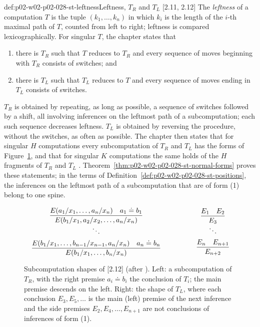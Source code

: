 \begin{hbdefinition}{def:p02-w02-p02-028-st-leftness}{Leftness, \(T_R\) and \(T_L\) [2.11, 2.12]}
The \emph{leftness} of a computation \(T\) is the tuple
\((k_1,\ldots,k_n)\) in which \(k_i\) is the length of the \(i\)-th maximal
path of \(T\), counted from left to right; leftness is compared
lexicographically.  For singular \(T\), the chapter states
\cite[\S2.11, p.~903]{Statman1977} that
\begin{enumerate}
  \item[(a)] there is \(T_R\) such that \(T\) reduces to \(T_R\) and every
        sequence of moves beginning with \(T_R\) consists of switches; and
  \item[(b)] there is \(T_L\) such that \(T_L\) reduces to \(T\) and every
        sequence of moves ending in \(T_L\) consists of switches.
\end{enumerate}
\(T_R\) is obtained by repeating, as long as possible, a sequence of switches
followed by a shift, all involving inferences on the leftmost path of a
subcomputation; each such sequence decreases leftness.  \(T_L\) is obtained
by reversing the procedure, without the switches, as often as possible.  The
chapter then states that for singular \(H\) computations every
subcomputation of \(T_R\) and \(T_L\) has the forms of
Figure~\ref{fig:p02-w02-p02-028-st-fragments}, and that for singular \(K\)
computations the same holds of the \(H\) fragments of \(T_R\) and \(T_L\)
\cite[\S2.12, pp.~903--904]{Statman1977}.
Theorem~\ref{thm:p02-w02-p02-028-st-normal-forms} proves these statements;
in the terms of Definition~\ref{def:p02-w02-p02-028-st-positions}, the
inferences on the leftmost path of a subcomputation that are of form (1)
belong to one spine.
\end{hbdefinition}

\begin{figure}[htbp]
\centering
\small
\[
\begin{array}{c@{\qquad\qquad}c}
\begin{array}{c}
\dfrac{E(a_1/x_1,\ldots,a_n/x_n)\quad a_1\doteq b_1}{E(b_1/x_1,a_2/x_2,\ldots,a_n/x_n)}\\[1ex]
\ddots\\[1ex]
\dfrac{E(b_1/x_1,\ldots,b_{n-1}/x_{n-1},a_n/x_n)\quad a_n\doteq b_n}{E(b_1/x_1,\ldots,b_n/x_n)}
\end{array}
&
\begin{array}{c}
\dfrac{E_1\quad E_2}{E_3}\\[1ex]
\ddots\\[1ex]
\dfrac{E_n\quad E_{n+1}}{E_{n+2}}
\end{array}
\end{array}
\]
\caption{Subcomputation shapes of [2.12] (after
\cite[p.~903]{Statman1977}).  Left: a subcomputation of \(T_R\), with the
right premise \(a_i\doteq b_i\) the conclusion of \(T_i\); the main premise
descends on the left.  Right: the shape of \(T_L\), where each conclusion
\(E_3,E_5,\ldots\) is the main (left) premise of the next inference and the
side premises \(E_2,E_4,\ldots,E_{n+1}\) are not conclusions of inferences of
form (1).}
\label{fig:p02-w02-p02-028-st-fragments}
\end{figure}

